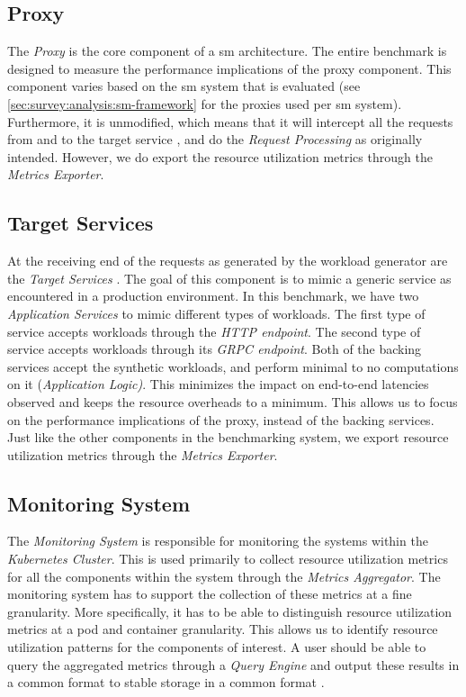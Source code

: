 \subsection{Proxy}
The \textit{Proxy}  is the core component of a \gls{sm} architecture. The entire benchmark is designed to measure the performance implications of the proxy component. This component varies based on the \gls{sm} system that is evaluated (see \cref{sec:survey:analysis:sm-framework} for the proxies used per \gls{sm} system). Furthermore, it is unmodified, which means that it will intercept all the requests from and to the target service , and do the \textit{Request Processing} as originally intended. However, we do export the resource utilization metrics through the \textit{Metrics Exporter}.

\subsection{Target Services}
At the receiving end of the requests as generated by the workload generator are the \textit{Target Services} . The goal of this component is to mimic a generic service as encountered in a production environment. In this benchmark, we have two \textit{Application Services} to mimic different types of workloads. The first type of service accepts workloads through the \textit{HTTP endpoint}. The second type of service accepts workloads through its \textit{GRPC endpoint}. Both of the backing services accept the synthetic workloads, and perform minimal to no computations on it (\textit{Application Logic)}. This minimizes the impact on end-to-end latencies observed and keeps the resource overheads to a minimum. This allows us to focus on the performance implications of the proxy, instead of the backing services. Just like the other components in the benchmarking system, we export resource utilization metrics through the \textit{Metrics Exporter}.


\subsection{Monitoring System}
The \textit{Monitoring System}  is responsible for monitoring the systems within the \textit{Kubernetes Cluster}. This is used primarily to collect resource utilization metrics for all the components within the system through the \textit{Metrics Aggregator}. The monitoring system has to support the collection of these metrics at a fine granularity. More specifically, it has to be able to distinguish resource utilization metrics at a pod and container granularity. This allows us to identify resource utilization patterns for the components of interest. A user should be able to query the aggregated metrics through a \textit{Query Engine} and output these results in a common format to stable storage in a common format .


